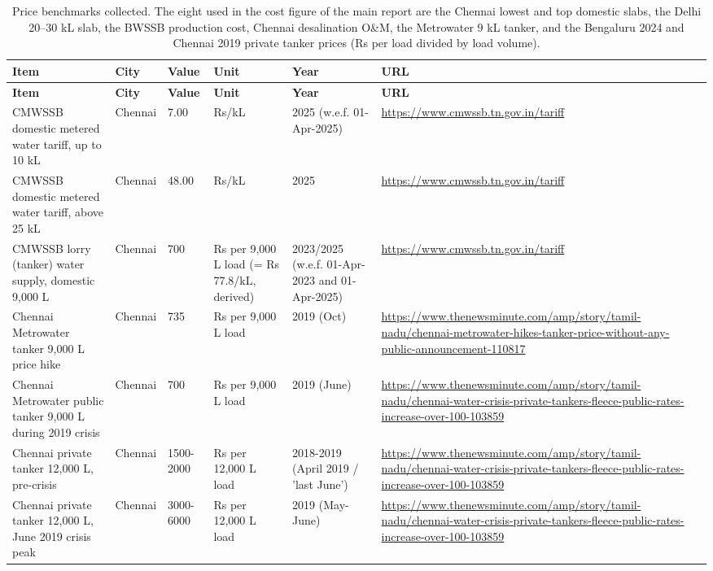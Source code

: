{\tiny\setlength{\tabcolsep}{3pt}
\begin{longtable}{p{4cm} p{1.5cm} p{2.5cm} p{2.1cm} p{1.7cm} p{3.4cm}}
\caption{Price benchmarks collected. The eight used in the cost figure of the main report are the Chennai lowest and top domestic slabs, the Delhi 20--30 kL slab, the BWSSB production cost, Chennai desalination O\&M, the Metrowater 9 kL tanker, and the Bengaluru 2024 and Chennai 2019 private tanker prices (Rs per load divided by load volume).}\label{tab:bench}\\
\toprule
\textbf{Item} & \textbf{City} & \textbf{Value} & \textbf{Unit} & \textbf{Year} & \textbf{URL}\\ \midrule\endfirsthead
\toprule \textbf{Item} & \textbf{City} & \textbf{Value} & \textbf{Unit} & \textbf{Year} & \textbf{URL}\\ \midrule\endhead
\bottomrule\endfoot
CMWSSB domestic metered water tariff, up to 10 kL & Chennai & 7.00 & Rs/kL & 2025 (w.e.f. 01-Apr-2025) & \url{https://www.cmwssb.tn.gov.in/tariff}\\
CMWSSB domestic metered water tariff, above 25 kL & Chennai & 48.00 & Rs/kL & 2025 & \url{https://www.cmwssb.tn.gov.in/tariff}\\
CMWSSB lorry (tanker) water supply, domestic 9,000 L & Chennai & 700 & Rs per 9,000 L load (= Rs 77.8/kL, derived) & 2023/2025 (w.e.f. 01-Apr-2023 and 01-Apr-2025) & \url{https://www.cmwssb.tn.gov.in/tariff}\\
Chennai Metrowater tanker 9,000 L price hike & Chennai & 735 & Rs per 9,000 L load & 2019 (Oct) & \url{https://www.thenewsminute.com/amp/story/tamil-nadu/chennai-metrowater-hikes-tanker-price-without-any-public-announcement-110817}\\
Chennai Metrowater public tanker 9,000 L during 2019 crisis & Chennai & 700 & Rs per 9,000 L load & 2019 (June) & \url{https://www.thenewsminute.com/amp/story/tamil-nadu/chennai-water-crisis-private-tankers-fleece-public-rates-increase-over-100-103859}\\
Chennai private tanker 12,000 L, pre-crisis & Chennai & 1500-2000 & Rs per 12,000 L load & 2018-2019 (April 2019 / 'last June') & \url{https://www.thenewsminute.com/amp/story/tamil-nadu/chennai-water-crisis-private-tankers-fleece-public-rates-increase-over-100-103859}\\
Chennai private tanker 12,000 L, June 2019 crisis peak & Chennai & 3000-6000 & Rs per 12,000 L load & 2019 (May-June) & \url{https://www.thenewsminute.com/amp/story/tamil-nadu/chennai-water-crisis-private-tankers-fleece-public-rates-increase-over-100-103859}\\

\end{longtable}}
